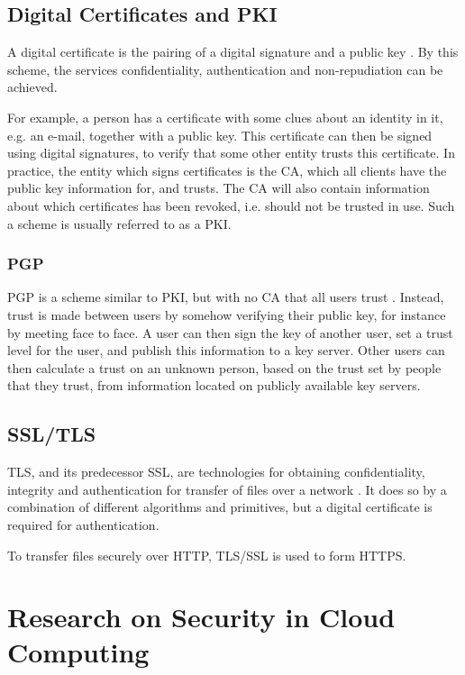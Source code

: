 \documentclass[pdftex,english,10pt,b5paper,twoside]{book}
\begin{document}
\subsection{Digital Certificates and PKI}

A digital certificate is the pairing of a digital signature and a public key
\cite{stallings}. By this scheme, the services confidentiality, authentication
and non-repudiation can be achieved.

For example, a person has a certificate with some clues about an identity in
it, e.g. an e-mail, together with a public key. This certificate can then be
signed using digital signatures, to verify that some other entity trusts this
certificate.
In practice, the entity which signs certificates is the \ac{CA}, which all
clients have the public key information for, and trusts. The \ac{CA} will also
contain information about which certificates has been revoked, i.e. should not
be trusted in use. Such a scheme is usually referred to as a \ac{PKI}.

\subsubsection{PGP}

\ac{PGP} is a scheme similar to \ac{PKI}, but with no \ac{CA} that all users
trust \cite{stallings}. Instead, trust is made between users by somehow
verifying their public key, for instance by meeting face to face. A user can
then sign the key of another user, set a trust level for the user, and publish
this information to a key server. Other users can then calculate a trust on an
unknown person, based on the trust set by people that they trust, from
information located on publicly available key servers.

\subsection{SSL/TLS}

\ac{TLS}, and its predecessor \ac{SSL}, are technologies for obtaining
confidentiality, integrity and authentication for transfer of files over a
network \cite{stallings}. It does so by a combination of different algorithms
and primitives, but a digital certificate is required for authentication.

To transfer files securely over \ac{HTTP}, \ac{TLS}/\ac{SSL} is used to form
\ac{HTTPS}.


\section{Research on Security in Cloud Computing}
\label{sec:research}
\end{document}
